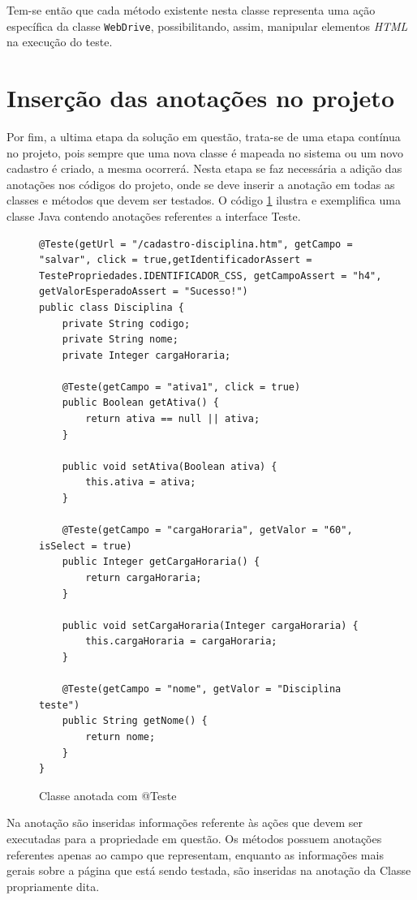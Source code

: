 \documentclass[tg]{mdtufsm}
\begin{document}
Tem-se então que cada método existente nesta classe representa uma ação específica da classe \texttt{WebDrive}, possibilitando, assim, manipular elementos \emph{HTML} na execução do teste.

\section{Inserção das anotações no projeto}
Por fim, a ultima etapa da solução em questão, trata-se de uma etapa contínua no projeto, pois sempre que uma nova classe é mapeada no sistema ou um novo cadastro é criado, a mesma ocorrerá. Nesta etapa se faz necessária a
adição das anotações nos códigos do projeto, onde se deve inserir a anotação em todas as classes e métodos que devem ser testados.
O código \ref{code:Disciplina.java} ilustra e exemplifica uma classe Java contendo anotações referentes a interface Teste.

\begin{figure}[!htt]
\begin{lstlisting}
@Teste(getUrl = "/cadastro-disciplina.htm", getCampo = "salvar", click = true,getIdentificadorAssert = TestePropriedades.IDENTIFICADOR_CSS, getCampoAssert = "h4", getValorEsperadoAssert = "Sucesso!")
public class Disciplina {
    private String codigo;
    private String nome;
    private Integer cargaHoraria;

    @Teste(getCampo = "ativa1", click = true)
    public Boolean getAtiva() {
        return ativa == null || ativa;
    }

    public void setAtiva(Boolean ativa) {
        this.ativa = ativa;
    }

    @Teste(getCampo = "cargaHoraria", getValor = "60", isSelect = true)
    public Integer getCargaHoraria() {
        return cargaHoraria;
    }

    public void setCargaHoraria(Integer cargaHoraria) {
        this.cargaHoraria = cargaHoraria;
    }

    @Teste(getCampo = "nome", getValor = "Disciplina teste")
    public String getNome() {
        return nome;
    }
}
\end{lstlisting}
	\caption{Classe anotada com @Teste}
	\label{code:Disciplina.java}
\end{figure}

Na anotação são inseridas informações referente às ações que devem ser executadas para a propriedade em questão. Os métodos possuem anotações referentes apenas ao campo que representam, enquanto as informações mais gerais sobre
a página que está sendo testada, são inseridas na anotação da Classe propriamente dita.
\end{document}
